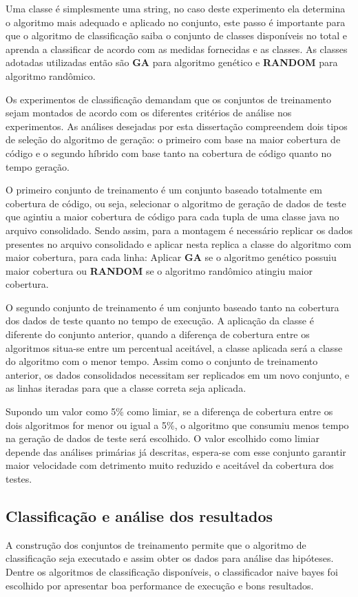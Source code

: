 \documentclass[
	12pt,				%
	oneside,			%
	a4paper,			%
	english,			%
	brazil				%
	]{abntex2ppgsi}
\begin{document}
Uma classe é simplesmente uma string, no caso deste experimento ela determina o algoritmo mais adequado e aplicado no conjunto, este passo é importante para que o algoritmo de classificação saiba o conjunto de classes disponíveis no total e aprenda a classificar de acordo com as medidas fornecidas e as classes. As classes adotadas utilizadas então são \textbf{GA} para algoritmo genético e \textbf{RANDOM} para algoritmo randômico.

Os experimentos de classificação demandam que os conjuntos de treinamento sejam montados de acordo com os diferentes critérios de análise nos experimentos. As análises desejadas por esta dissertação compreendem dois tipos de seleção do algoritmo de geração: o primeiro com base na maior cobertura de código e o segundo híbrido com base tanto na cobertura de código quanto no tempo geração.

O primeiro conjunto de treinamento é um conjunto baseado totalmente em cobertura de código, ou seja, selecionar o algoritmo de geração de dados de teste que agintiu a maior cobertura de código para cada tupla de uma classe java no arquivo consolidado. Sendo assim, para a montagem é necessário replicar os dados presentes no arquivo consolidado e aplicar nesta replica a classe do algoritmo com maior cobertura, para cada linha: Aplicar \textbf{GA}  se o algoritmo genético possuiu  maior cobertura ou \textbf{RANDOM} se o algoritmo randômico atingiu maior cobertura.

O segundo conjunto de treinamento é um conjunto baseado tanto na cobertura dos dados de teste quanto no tempo de execução. A aplicação da classe é diferente do conjunto anterior, quando a diferença de cobertura entre os algoritmos situa-se entre um percentual aceitável, a classe aplicada será a classe do algoritmo com o menor tempo. Assim como o conjunto de treinamento anterior, os dados consolidados necessitam ser replicados em um novo conjunto, e as linhas iteradas para que a classe correta seja aplicada.

Supondo um valor como 5\% como limiar, se a diferença de cobertura entre os dois algoritmos for menor ou igual a 5\%, o algoritmo que consumiu menos tempo na geração de dados de teste será escolhido. O valor escolhido como limiar depende das análises primárias já descritas, espera-se com esse conjunto garantir maior velocidade com detrimento muito reduzido e aceitável da cobertura dos testes.

\subsection{Classificação e análise dos resultados}
A construção dos conjuntos de treinamento permite que o algoritmo de classificação seja executado e assim obter os dados para análise das hipóteses. Dentre os algoritmos de classificação disponíveis, o classificador naive bayes foi escolhido por apresentar boa performance de execução e bons resultados.
\end{document}
